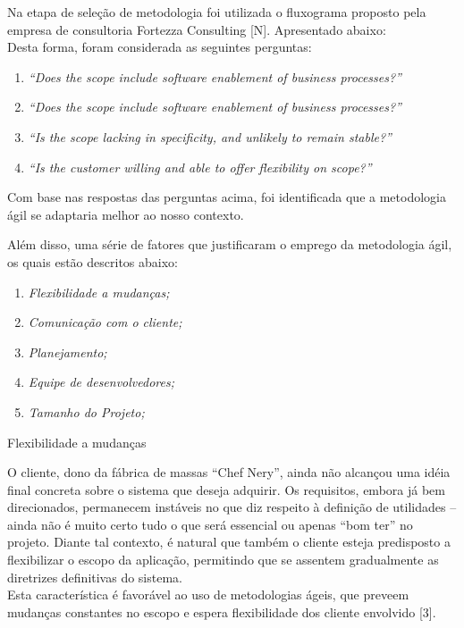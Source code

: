 \tab Na etapa de seleção de metodologia foi utilizada o fluxograma proposto pela empresa de consultoria Fortezza Consulting [N]. Apresentado abaixo: \\ 

\tab Desta forma, foram considerada as seguintes perguntas: \\

\begin{enumerate}
	\item \textsl{“Does the scope include software enablement of business processes?”} 
	\item \textsl{“Does the scope include software enablement of business processes?”}
	\item \textsl{“Is the scope lacking in specificity, and unlikely to remain stable?”} 
	\item \textsl{“Is the customer willing and able to offer flexibility on scope?”} 
\end{enumerate}

\tab Com base nas respostas das perguntas acima, foi identificada que a metodologia ágil se adaptaria melhor ao nosso contexto.  

\tab Além disso, uma série de fatores que justificaram o emprego da metodologia ágil, os quais estão descritos abaixo:

\begin{enumerate}
	\item \textsl{Flexibilidade a mudanças;} 
	\item \textsl{Comunicação com o cliente;}
	\item \textsl{Planejamento;} 
	\item \textsl{Equipe de desenvolvedores;}
	\item \textsl{Tamanho do Projeto;}
\end{enumerate}


{
	\large{Flexibilidade a mudanças\\}

	\tab O cliente, dono da fábrica de massas “Chef Nery”, ainda não alcançou uma idéia final concreta sobre o sistema que deseja adquirir. Os requisitos, embora já bem direcionados, permanecem instáveis no que diz respeito à definição de utilidades – ainda não é muito certo tudo o que será essencial ou apenas “bom ter” no projeto. Diante tal contexto, é natural que também o cliente esteja predisposto a flexibilizar o escopo da aplicação, permitindo que se assentem gradualmente as diretrizes definitivas do sistema. \\
	\tab Esta característica é favorável ao uso de metodologias ágeis, que preveem mudanças constantes no escopo e espera flexibilidade dos cliente envolvido [3]. \\
}

